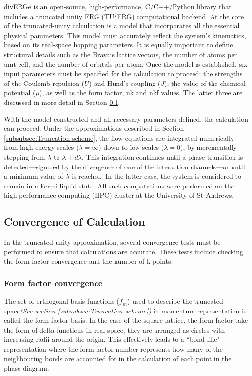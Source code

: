 \documentclass[12pt]{article}
\begin{document}
divERGe is an open-source, high-performance, C/C++/Python library that includes a truncated unity FRG (TU$^2$FRG) computational backend\cite{profe2024diverge}. 
At the core of the truncated-unity calculation is a model that incorporates all the essential physical parameters. This model must accurately reflect the system's kinematics, based on its real-space hopping parameters.
It is equally important to define structural details such as the Bravais lattice vectors, the number of atoms per unit cell, 
and the number of orbitals per atom. Once the model is established, six input parameters must be specified for the calculation to proceed: 
the strengths of the Coulomb repulsion ($U$) and Hund’s coupling ($J$), the value of the chemical potential ($\mu$), as well as the form factor, nk and nkf
values. The latter three are discussed in more detail in Section \ref{subsec:convergence}.\par
\medskip
\noindent With the model constructed and all necessary parameters defined, 
the calculation can proceed. Under the approximations described in Section \ref{subsubsec:Truncation scheme},
the flow equations are integrated numerically from high energy scales ($\lambda = \infty$) down to low scales ($\lambda = 0$), 
by incrementally stepping from $\lambda$ to $\lambda + d\lambda$. This integration continues until a phase transition is detected—signaled 
by the divergence of one of the interaction channels—or until a minimum value of $\lambda$ is reached. In the latter case, the system is considered to remain 
in a Fermi-liquid state. All such computations were performed on the high-performance computing (HPC) cluster at the University of St Andrews.


 

\subsection{Convergence of Calculation}
\label{subsec:convergence}
In the truncated-unity approximation, several convergence tests must be performed to ensure that calculations are accurate.
These tests include checking the form factor convergence and the number of k points.

\subsubsection{Form factor convergence}

The set of orthogonal basis functions ($f_m$) used to describe the truncated space\textit{(See section \ref{subsubsec:Truncation scheme})}
in momentum representation is called the form factor basis\cite{lichtenstein2018functional}. In the case of the square lattice, 
the form factor take the form of delta functions in real space; they are arranged as circles with increasing radii around the origin. This effectively leads to a ``bond-like" representation where the form-factor number
represents how many of the neighbouring bonds are accounted for in the calculation of each point in the phase diagram.\par
\end{document}
